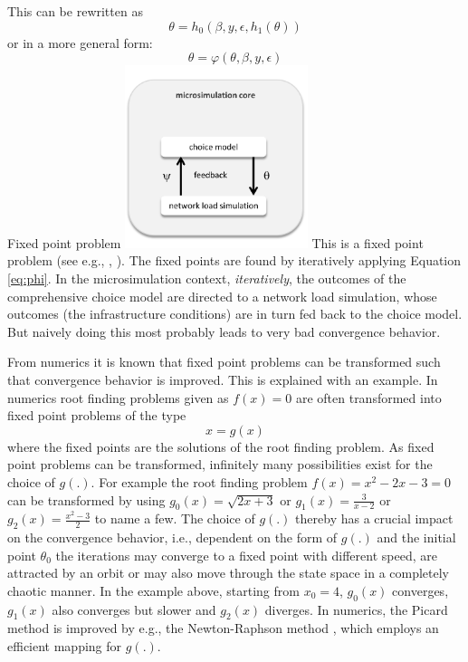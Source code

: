This can be rewritten as
\begin{equation}
\theta = h_0(\beta, y, \epsilon, h_1(\theta))
\end{equation}
%
or in a more general form:
%
\begin{equation}
\label{eq:phi}
\theta = \varphi(\theta, \beta, y, \epsilon) %
\end{equation}
%
%
%
{Fixed point problem}%
{\label{fig:fixedpoint}}%
{\includegraphics[width=0.4\textwidth, angle=0]{understanding/figures/fixedpoint.pdf}}%
{}%
%
%
This is a fixed point problem (see e.g., \citet[][p.6]{RamaduraiUkkusuri_TechRep_RPI_2008}, \citet[][]{BierlaireCrittin_TransScience_2006, KaufmanEtAl_TransResC_1998, RamaduraiUkkusuri_NSE_2010}). The fixed points are found by iteratively applying Equation \ref{eq:phi}. In the microsimulation context, \emph{iteratively}, the outcomes of the comprehensive choice model are directed to a network load simulation, whose outcomes (the infrastructure conditions) are in turn fed back to the choice model. But naively doing this most probably leads to very bad convergence behavior.

From numerics it is known that fixed point problems can be transformed such that convergence behavior is improved. This is explained with an example. In numerics root finding problems given as $f(x)=0$ are often transformed into fixed point problems of the type
\begin{equation}
\label{eq:fpf}
x=g(x)
\end{equation}
where the fixed points are the solutions of the root finding problem. As fixed point problems can be transformed, infinitely many possibilities exist for the choice of $g(.)$. For example the root finding problem $f(x)=x^2-2x-3=0$ can be transformed by using $g_0(x)=\sqrt{2x+3}$ or $g_1(x)=\frac{3}{x-2}$ or $g_2(x)=\frac{x^2-3}{2}$ to name a few. The choice of $g(.)$ thereby has a crucial impact on the convergence behavior, i.e., dependent on the form of $g(.)$ and the initial point $\theta_0$ the iterations may converge to a fixed point with different speed, are attracted by an orbit or may also move through the state space in a completely chaotic manner. In the example above, starting from $x_0=4$, $g_0(x)$ converges, $g_1(x)$ also converges but slower and $g_2(x)$ diverges. In numerics, the Picard method \citep[][p.2ff]{Vogt_TechRep_IfMath_2001} is improved by e.g., the Newton-Raphson method \citep[][p.28ff]{Vogt_TechRep_IfMath_2001}, which employs an efficient mapping for $g(.)$. 

